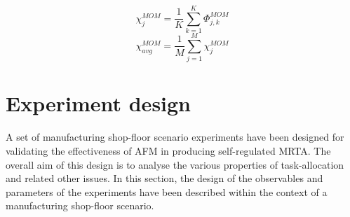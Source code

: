 \begin{equation}
\chi_{j}^{MOM}= \frac{1}{K} \sum_{k=1}^{K} \Phi_{j, k}^{MOM}
\label{eqn:sigle-pmw}
\end{equation}
\begin{equation}
\chi_{avg}^{MOM}= \frac{1}{M} \sum_{j=1}^{M} {\chi_{j}^{MOM}}
\label{eqn:avg-pmw}
\end{equation}
\section{Experiment design}
\label{afm:expt-design}
A set of  manufacturing shop-floor scenario experiments have been designed for validating the effectiveness of AFM in producing self-regulated MRTA.  The overall aim of this design is to analyse the various properties of task-allocation and related other issues. In this section,  the design of the observables and parameters of the experiments have been described within the context of a manufacturing shop-floor scenario. 
